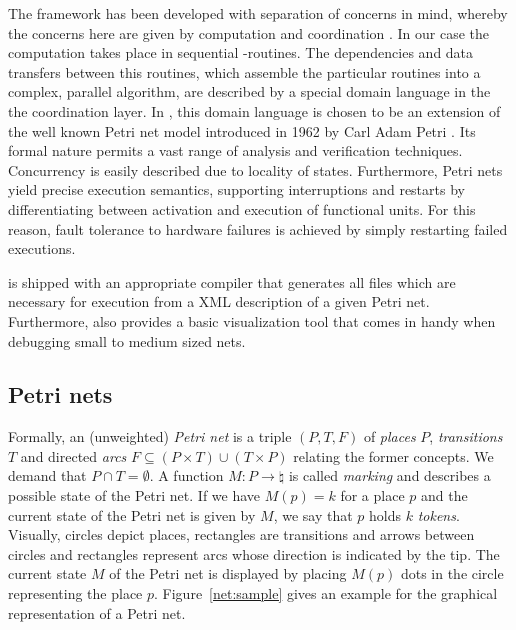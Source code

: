 The framework has been developed with separation of concerns in mind, whereby the concerns here are given by computation and coordination \cite{coordination_language}. In our case the computation takes place in sequential \singular-routines. The dependencies and data transfers between this routines, which assemble the particular routines into a complex, parallel algorithm, are described by a special domain language in the the coordination layer. In \gpispace{}, this domain language is chosen to be an extension of the well known Petri net model introduced in 1962 by Carl Adam Petri \cite{petri}. Its formal nature permits a vast range of analysis and verification techniques. Concurrency is easily described due to locality of states. Furthermore, Petri nets yield precise execution semantics, supporting interruptions and restarts by differentiating between activation and execution of functional units. For this reason, fault tolerance to hardware failures is achieved by simply restarting failed executions. \cite{petri_net_wms}

\gpispace{} is shipped with an appropriate compiler that generates all files which are necessary for execution from a XML description of a given Petri net. Furthermore, \gpispace{} also provides a basic visualization tool that comes in handy when debugging small to medium sized nets.

\subsection*{Petri nets}

Formally, an (unweighted) \emph{Petri net} is a triple $(P, T, F)$ of \emph{places} $P$, \emph{transitions} $T$ and directed \emph{arcs} $F\subseteq (P\times T)\cup(T\times P)$ relating the former concepts. We demand that $P\cap T = \emptyset$. A function $M\colon P\rightarrow\natural$ is called \emph{marking} and describes a possible state of the Petri net. If we have $M(p)=k$ for a place $p$ and the current state of the Petri net is given by $M$, we say that $p$ holds $k$ \emph{tokens}. Visually, circles depict places, rectangles are transitions and arrows between circles and rectangles represent arcs whose direction is indicated by the tip. The current state $M$ of the Petri net is displayed by placing $M(p)$ dots in the circle representing the place $p$. Figure~\ref{net:sample} gives an example for the graphical representation of a Petri net.



